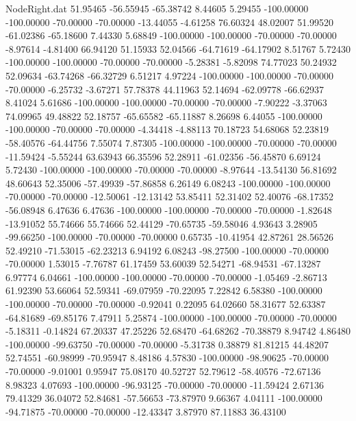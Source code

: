 \begin{filecontents}{NodeRight.dat}
  51.95465  -56.55945  -65.38742     8.44605    5.29455 -100.00000 -100.00000  -70.00000  -70.00000  -13.44055   -4.61258   76.60324   48.02007
  51.99520  -61.02386  -65.18600     7.44330    5.68849 -100.00000 -100.00000  -70.00000  -70.00000   -8.97614   -4.81400   66.94120   51.15933
  52.04566  -64.71619  -64.17902     8.51767    5.72430 -100.00000 -100.00000  -70.00000  -70.00000   -5.28381   -5.82098   74.77023   50.24932
  52.09634  -63.74268  -66.32729     6.51217    4.97224 -100.00000 -100.00000  -70.00000  -70.00000   -6.25732   -3.67271   57.78378   44.11963
  52.14694  -62.09778  -66.62937     8.41024    5.61686 -100.00000 -100.00000  -70.00000  -70.00000   -7.90222   -3.37063   74.09965   49.48822
  52.18757  -65.65582  -65.11887     8.26698    6.44055 -100.00000 -100.00000  -70.00000  -70.00000   -4.34418   -4.88113   70.18723   54.68068
  52.23819  -58.40576  -64.44756     7.55074    7.87305 -100.00000 -100.00000  -70.00000  -70.00000  -11.59424   -5.55244   63.63943   66.35596
  52.28911  -61.02356  -56.45870     6.69124    5.72430 -100.00000 -100.00000  -70.00000  -70.00000   -8.97644  -13.54130   56.81692   48.60643
  52.35006  -57.49939  -57.86858     6.26149    6.08243 -100.00000 -100.00000  -70.00000  -70.00000  -12.50061  -12.13142   53.85411   52.31402
  52.40076  -68.17352  -56.08948     6.47636    6.47636 -100.00000 -100.00000  -70.00000  -70.00000   -1.82648  -13.91052   55.74666   55.74666
  52.44129  -70.65735  -59.58046     4.93643    3.28905  -99.66250 -100.00000  -70.00000  -70.00000    0.65735  -10.41954   42.87261   28.56526
  52.49210  -71.53015  -62.23213     6.94192    6.08243  -98.27500 -100.00000  -70.00000  -70.00000    1.53015   -7.76787   61.17459   53.60039
  52.54271  -68.94531  -67.13287     6.97774    6.04661 -100.00000 -100.00000  -70.00000  -70.00000   -1.05469   -2.86713   61.92390   53.66064
  52.59341  -69.07959  -70.22095     7.22842    6.58380 -100.00000 -100.00000  -70.00000  -70.00000   -0.92041    0.22095   64.02660   58.31677
  52.63387  -64.81689  -69.85176     7.47911    5.25874 -100.00000 -100.00000  -70.00000  -70.00000   -5.18311   -0.14824   67.20337   47.25226
  52.68470  -64.68262  -70.38879     8.94742    4.86480 -100.00000  -99.63750  -70.00000  -70.00000   -5.31738    0.38879   81.81215   44.48207
  52.74551  -60.98999  -70.95947     8.48186    4.57830 -100.00000  -98.90625  -70.00000  -70.00000   -9.01001    0.95947   75.08170   40.52727
  52.79612  -58.40576  -72.67136     8.98323    4.07693 -100.00000  -96.93125  -70.00000  -70.00000  -11.59424    2.67136   79.41329   36.04072
  52.84681  -57.56653  -73.87970     9.66367    4.04111 -100.00000  -94.71875  -70.00000  -70.00000  -12.43347    3.87970   87.11883   36.43100

\end{filecontents}
